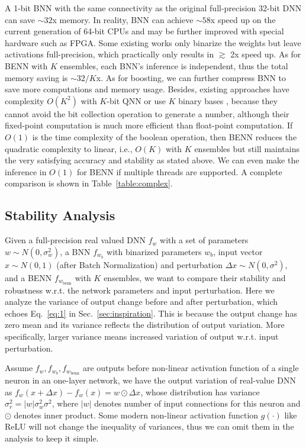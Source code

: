\documentclass[10pt,twocolumn,letterpaper]{article}
\begin{document}
A 1-bit BNN with the same connectivity as the original full-precision 32-bit DNN can save $\sim 32$x memory. In reality, BNN can achieve $\sim 58$x speed up on the current generation of 64-bit CPUs \cite{rastegari2016xnor} and may be further improved with special hardware such as FPGA. Some existing works only binarize the weights but leave activations full-precision, which practically only results in $\gtrsim$ 2x speed up. As for BENN with $K$ ensembles, each BNN's inference is independent, thus the total memory saving is $\sim 32/K$x. As for boosting, we can further compress BNN to save more computations and memory usage. Besides, existing approaches have complexity $O(K^{2})$ with $K$-bit QNN \cite{zhou2016dorefa} or use $K$ binary bases \cite{lin2017towards}, because they cannot avoid the bit collection operation to generate a number, although their fixed-point computation is much more efficient than float-point computation. If $O(1)$ is the time complexity of the boolean operation, then BENN reduces the quadratic complexity to linear, i.e., $O(K)$ with $K$ ensembles but still maintains the very satisfying accuracy and stability as stated above. We can even make the inference in $O(1)$ for BENN if multiple threads are supported. A complete comparison is shown in Table~\ref{table:complex}.

\subsection{Stability Analysis}
\label{sec:analysis}
Given a full-precision real valued DNN $f_{w}$ with a set of parameters $w \sim N(0,\sigma_{w}^{2})$, a BNN $f_{w_{b}}$ with binarized parameters $w_{b}$, input vector $x \sim N(0,1)$ (after Batch Normalization) and perturbation $\Delta x \sim N(0,\sigma^{2})$, and a BENN $f_{w_{\text{benn}}}$ with $K$ ensembles, we want to compare their stability and robustness w.r.t. the network parameters and input perturbation. Here we analyze the variance of output change before and after perturbation, which echoes Eq.~\ref{eq:1} in Sec.~\ref{sec:inspiration}. This is because the output change has zero mean and its variance reflects the distribution of output variation. More specifically, larger variance means increased variation of output w.r.t. input perturbation.

Assume $f_{w}, f_{w_{b}}, f_{w_{\text{benn}}}$ are outputs before non-linear activation function of a single neuron in an one-layer network, we have the output variation of real-value DNN as $f_{w}(x+\Delta x) - f_{w}(x) = w \odot \Delta x$, 
whose distribution has variance $\sigma_{r}^{2} = |w|\sigma_{w}^{2}\sigma^{2}$, where $|w|$ denotes number of input connections for this neuron and $\odot$ denotes inner product. Some modern non-linear activation function $g(\cdot)$ like ReLU will not change the inequality of variances, thus we can omit them in the analysis to keep it simple.
\end{document}
